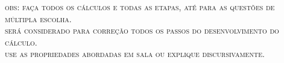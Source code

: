 \documentclass[10pt,a4paper]{article}
\begin{document}


	\begin{center}
		\textsc{obs: faça todos os cálculos e todas as etapas, até para as questões de múltipla escolha. \\ será considerado para correção todos os passos do desenvolvimento do cálculo. \\ use as propriedades abordadas em sala ou explique discursivamente.}    
	\end{center}


	\begin{multicols}{2}
	\setlength\columnseprule{1pt} %
	
		
		
		
		
		
		
		
		
		
	
	\end{multicols}
\end{document}
